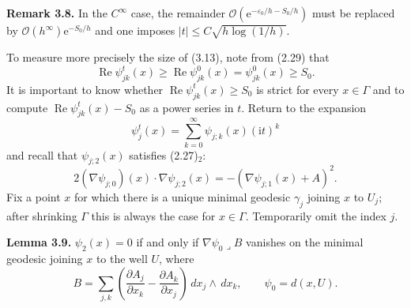 \documentclass[11pt]{article}
\newcommand{\Ree}{\operatorname{Re}}
\newcommand{\OO}{\mathcal O}
\newcommand{\dd}{\,d}
\newcommand{\ii}{\mathrm{i}}
\newcommand{\e}{\mathrm{e}}
\begin{document}
\medskip
\noindent\textbf{Remark 3.8.}
In the $C^\infty$ case, the remainder $\OO(\e^{-\varepsilon_0/h-S_0/h})$ must be replaced by $\OO(h^\infty)\e^{-S_0/h}$ and one imposes $|t|\le C\sqrt{h\log(1/h)}$.

To measure more precisely the size of (3.13), note from (2.29) that
\begin{equation}
\Ree\psi_{jk}^t(x)\ge\Ree\psi_{jk}^0(x)=\psi_{jk}^0(x)\ge S_0.
\tag{3.15}
\end{equation}
It is important to know whether $\Ree\psi_{jk}^t(x)\ge S_0$ is strict for every $x\in\Gamma$ and to compute $\Ree\psi_{jk}^t(x)-S_0$ as a power series in $t$.
Return to the expansion
\begin{equation}
\psi_j^t(x)=\sum_{k=0}^\infty\psi_{j;k}(x)(\ii t)^k
\tag{3.16}
\end{equation}
and recall that $\psi_{j;2}(x)$ satisfies (2.27)$_2$:
\begin{equation}
2(\nabla\psi_{j;0})(x)\cdot\nabla\psi_{j;2}(x)
=-(\nabla\psi_{j;1}(x)+A)^2.
\tag{3.17}
\end{equation}
Fix a point $x$ for which there is a unique minimal geodesic $\gamma_j$ joining $x$ to $U_j$; after shrinking $\Gamma$ this is always the case for $x\in\Gamma$. Temporarily omit the index $j$.

\medskip
\noindent\textbf{Lemma 3.9.}
$\psi_2(x)=0$ if and only if $\nabla\psi_0\mathbin{\lrcorner}B$ vanishes on the minimal geodesic joining $x$ to the well $U$, where
\[
B=\sum_{j,k}\left(\frac{\partial A_j}{\partial x_k}-\frac{\partial A_k}{\partial x_j}\right)\dd x_j\wedge\dd x_k,
\qquad
\psi_0=d(x,U).
\]
\end{document}
